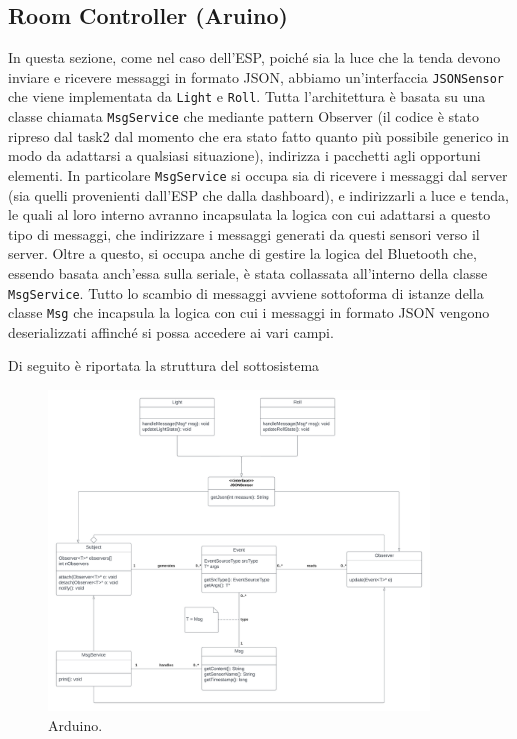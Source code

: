 \documentclass[a4paper,12pt]{report}
\begin{document}
\subsection{Room Controller (Aruino)}
In questa sezione, come nel caso dell'ESP, poiché sia la luce che la tenda devono inviare e ricevere messaggi in formato JSON, abbiamo un'interfaccia \texttt{JSONSensor} che viene implementata da \texttt{Light} e \texttt{Roll}.
Tutta l'architettura è basata su una classe chiamata \texttt{MsgService} che mediante pattern Observer (il codice è stato ripreso dal task2 dal momento che era stato fatto quanto più possibile generico in modo da adattarsi a qualsiasi situazione), indirizza i pacchetti agli opportuni elementi. In particolare \texttt{MsgService} si occupa sia di ricevere i messaggi dal server (sia quelli provenienti dall'ESP che dalla dashboard), e indirizzarli a luce e tenda, le quali al loro interno avranno incapsulata la logica con cui adattarsi a questo tipo di messaggi, che indirizzare i messaggi generati da questi sensori verso il server. Oltre a questo, si occupa anche di gestire la logica del Bluetooth che, essendo basata anch'essa sulla seriale, è stata collassata all'interno della classe \texttt{MsgService}.
Tutto lo scambio di messaggi avviene sottoforma di istanze della classe \texttt{Msg} che incapsula la logica con cui i messaggi in formato JSON vengono deserializzati affinché si possa accedere ai vari campi. 

Di seguito è riportata la struttura del sottosistema 
\begin{figure}[H]
    \centering
    \includegraphics[width=0.9\textwidth]{img/Classi - arduino.png}
    \caption{Arduino.}
    \label{fig:arduino}
\end{figure}
\end{document}
